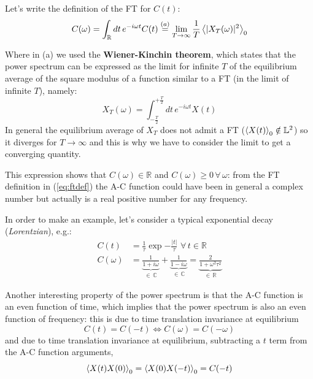\documentclass[\main/main.tex]{subfiles}
\begin{document}
Let's write the definition of the FT for $C(t)$:
\begin{align}
   C(\omega)=\int_{\mathbb{R}} dt \,e^{-i\omega t}C(t) \overset{(a)}{=} \lim_{T\to\infty}\frac{1}{T}\left\langle |X_T(\omega)|^2 \right\rangle_0
   \label{eq:ftdef}
\end{align}

Where in (a) we used the \textbf{Wiener-Kinchin theorem}, which states that the power spectrum can be expressed as the limit for infinite $T$ of the equilibrium average of the square modulus of a function similar to a FT (in the limit of infinite $T$), namely:
\begin{equation}
    X_T(\omega)=\int_{-\frac{T}{2}}^{+\frac{T}{2}}dt\, e^{-i\omega t} X(t)
\end{equation}
In general the equilibrium average of $X_T$ does not admit a FT ($\left\langle X(t) \right\rangle_0 \notin \mathbb{L}^2$) so it diverges for $T\to\infty$ and this is why we have to consider the limit to get a converging quantity.

This expression shows that $C(\omega)\in \mathbb{R}$ and $C(\omega)\geq 0 \, \forall\, \omega$: from the FT definition in (\ref{eq:ftdef}) the A-C function could have been in general a complex number but actually is a real positive number for any frequency.

In order to make an example, let's consider a typical exponential decay (\textit{Lorentzian}), e.g.:
\begin{align}
    C(t) &=\frac{1}{\tau}\exp{-\frac{|t|}{\tau}} \,\, \forall \,t \in \mathbb{R}\\
    C(\omega) &= \underbrace{\frac{1}{1+i\omega}}_{\in\, \mathbb{C}}+\underbrace{\frac{1}{1-i\omega}}_{\in\,\mathbb{C}}=\underbrace{\frac{2}{1+\omega^2\tau^2}}_{\in \, \mathbb{R}}
\end{align}

Another interesting property of the power spectrum is that the A-C function is an even function of time, which implies that the power spectrum is also an even function of frequency: this is due to time translation invariance at equilibrium
\begin{equation}
    C(t)=C(-t) \Longleftrightarrow C(\omega)=C(-\omega)
\end{equation}
and due to time translation invariance at equilibrium, subtracting a $t$ term from the A-C function arguments,
\begin{equation}
    \left\langle X(t)X(0) \right\rangle_0=\left\langle X(0)X(-t) \right\rangle_0=C(-t)
\end{equation}
\end{document}
